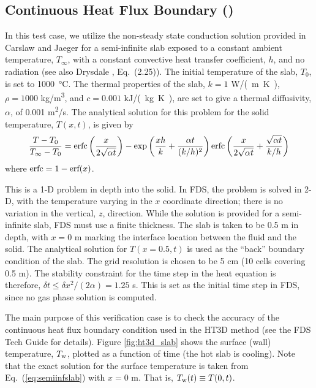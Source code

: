 \documentclass[11pt]{book}
\begin{document}
\FloatBarrier


\subsection{Continuous Heat Flux Boundary (\texorpdfstring{}{ht3d\_slab})}
\label{ht3d_slab}

In this test case, we utilize the non-steady state conduction solution provided in Carslaw and Jaeger \cite{Carslaw:1} for a semi-infinite slab exposed to a constant ambient temperature, $T_\infty$, with a constant convective heat transfer coefficient, $h$, and no radiation (see also Drysdale \cite{Drysdale:1}, Eq.~(2.25)).  The initial temperature of the slab, $T_0$, is set to \SI{1000}{\degreeCelsius}. The thermal properties of the slab, $k=1$ \si{W/(m.K)}, $\rho=1000$ \si{kg/m^3}, and $c=0.001$ \si{kJ/(kg.K)}, are set to give a thermal diffusivity, $\alpha$, of 0.001 \si{m^2/s}. The analytical solution for this problem for the solid temperature, $T(x,t)$, is given by
\begin{equation}
\label{eq:semiinfslab}
\frac{T - T_0}{T_\infty - T_0} = \hbox{erfc}\left(\frac{x}{2\sqrt{\alpha t}}\right) - \exp\left( \frac{xh}{k} + \frac{\alpha t}{(k/h)^2} \right) \hbox{erfc}\left( \frac{x}{2\sqrt{\alpha t}} + \frac{\sqrt{\alpha t}}{k/h} \right)
\end{equation}
where $\hbox{erfc} = 1 - \hbox{erf}(x)$.

This is a 1-D problem in depth into the solid.  In FDS, the problem is solved in 2-D, with the temperature varying in the $x$ coordinate direction; there is no variation in the vertical, $z$, direction.  While the solution is provided for a semi-infinite slab, FDS must use a finite thickness.  The slab is taken to be 0.5 m in depth, with $x=0$ m marking the interface location between the fluid and the solid.  The analytical solution for $T(x=0.5,t)$ is used as the ``back'' boundary condition of the slab.  The grid resolution is chosen to be 5 cm (10 cells covering 0.5 m).  The stability constraint for the time step in the heat equation is therefore, $\delta t \le \delta x^2/(2\alpha) = 1.25$ s.  This is set as the initial time step in FDS, since no gas phase solution is computed.

The main purpose of this verification case is to check the accuracy of the continuous heat flux boundary condition used in the HT3D method (see the FDS Tech Guide \cite{FDS_Math_Guide} for details).  Figure \ref{fig:ht3d_slab} shows the surface (wall) temperature, $T_{\rm w}$, plotted as a function of time (the hot slab is cooling).  Note that the exact solution for the surface temperature is taken from Eq.~(\ref{eq:semiinfslab}) with $x=0$ m.  That is, $T_{\rm w}(t) \equiv T(0,t)$.
\end{document}
